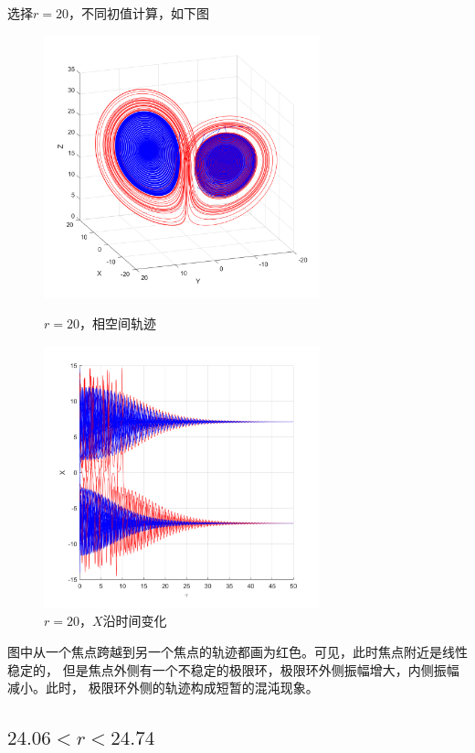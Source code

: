 \documentclass[UTF8,zihao=5]{ctexart} %
\begin{document}
选择$r=20$，不同初值计算，如下图
\begin{figure}[H]
    \begin{minipage}[c]{0.45\linewidth}  %
        \centering
        \includegraphics[width=8cm]{XYZ_r_20.png}  %
        \caption{$r=20$，相空间轨迹}
    \end{minipage}
    \hfill %
    \begin{minipage}[c]{0.45\linewidth}  %
        \centering
        \includegraphics[width=8cm]{XT_r_20.png}  %
        \caption{$r=20$，$X$沿时间变化}
    \end{minipage}
\end{figure}
图中从一个焦点跨越到另一个焦点的轨迹都画为红色。可见，此时焦点附近是线性稳定的，
但是焦点外侧有一个不稳定的极限环，极限环外侧振幅增大，内侧振幅减小。此时，
极限环外侧的轨迹构成短暂的混沌现象。

\subsection{$24.06<r<24.74$}
\end{document}

